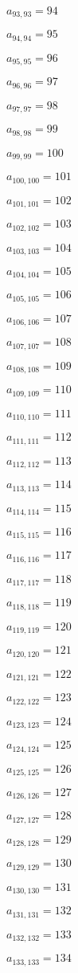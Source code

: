 \documentclass[a4paper,12pt]{article}
\begin{document}
$a _{ 93, 93 } = 94$

$a _{ 94, 94 } = 95$

$a _{ 95, 95 } = 96$

$a _{ 96, 96 } = 97$

$a _{ 97, 97 } = 98$

$a _{ 98, 98 } = 99$

$a _{ 99, 99 } = 100$

$a _{ 100, 100 } = 101$

$a _{ 101, 101 } = 102$

$a _{ 102, 102 } = 103$

$a _{ 103, 103 } = 104$

$a _{ 104, 104 } = 105$

$a _{ 105, 105 } = 106$

$a _{ 106, 106 } = 107$

$a _{ 107, 107 } = 108$

$a _{ 108, 108 } = 109$

$a _{ 109, 109 } = 110$

$a _{ 110, 110 } = 111$

$a _{ 111, 111 } = 112$

$a _{ 112, 112 } = 113$

$a _{ 113, 113 } = 114$

$a _{ 114, 114 } = 115$

$a _{ 115, 115 } = 116$

$a _{ 116, 116 } = 117$

$a _{ 117, 117 } = 118$

$a _{ 118, 118 } = 119$

$a _{ 119, 119 } = 120$

$a _{ 120, 120 } = 121$

$a _{ 121, 121 } = 122$

$a _{ 122, 122 } = 123$

$a _{ 123, 123 } = 124$

$a _{ 124, 124 } = 125$

$a _{ 125, 125 } = 126$

$a _{ 126, 126 } = 127$

$a _{ 127, 127 } = 128$

$a _{ 128, 128 } = 129$

$a _{ 129, 129 } = 130$

$a _{ 130, 130 } = 131$

$a _{ 131, 131 } = 132$

$a _{ 132, 132 } = 133$

$a _{ 133, 133 } = 134$
\end{document}
